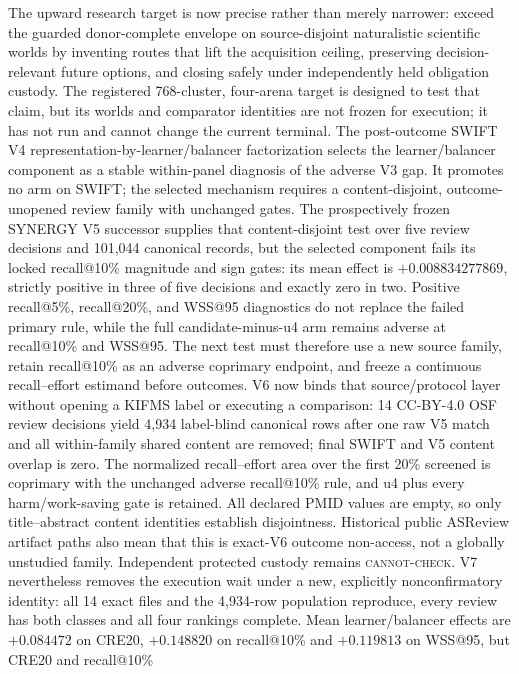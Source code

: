 \documentclass[11pt]{article}
\theoremstyle{definition}
\begin{document}
The upward research target is now precise rather than merely narrower: exceed
the guarded donor-complete envelope on source-disjoint naturalistic scientific
worlds by inventing routes that lift the acquisition ceiling, preserving
decision-relevant future options, and closing safely under independently held
obligation custody.  The registered 768-cluster, four-arena target is designed
to test that claim, but its worlds and comparator identities are not frozen for
execution; it has not run and cannot change the current terminal.  The
post-outcome SWIFT V4 representation-by-learner/balancer factorization selects
the learner/balancer component as a stable within-panel diagnosis of the
adverse V3 gap.  It promotes no arm on SWIFT; the selected mechanism requires a
content-disjoint, outcome-unopened review family with unchanged gates.  The
prospectively frozen SYNERGY V5 successor supplies that content-disjoint test
over five review decisions and 101,044 canonical records, but the selected
component fails its locked recall@10\% magnitude and sign gates: its mean
effect is $+0.008834277869$, strictly positive in three of five decisions and
exactly zero in two.  Positive recall@5\%, recall@20\%, and WSS@95 diagnostics
do not replace the failed primary rule, while the full candidate-minus-u4 arm
remains adverse at recall@10\% and WSS@95.  The next test must therefore use a
new source family, retain recall@10\% as an adverse coprimary endpoint, and
freeze a continuous recall--effort estimand before outcomes.  V6 now binds that
source/protocol layer without opening a KIFMS label or executing a comparison:
14 CC-BY-4.0 OSF review decisions yield 4,934 label-blind canonical rows after
one raw V5 match and all within-family shared content are removed; final SWIFT
and V5 content overlap is zero.  The normalized recall--effort area over the
first 20\% screened is coprimary with the unchanged adverse recall@10\% rule,
and u4 plus every harm/work-saving gate is retained.  All declared PMID values
are empty, so only title--abstract content identities establish disjointness.
Historical public ASReview artifact paths also mean that this is exact-V6
outcome non-access, not a globally unstudied family.  Independent protected
custody remains \textsc{cannot-check}. V7 nevertheless removes the execution
wait under a new, explicitly nonconfirmatory identity: all 14 exact files and
the 4,934-row population reproduce, every review has both classes and all four
rankings complete. Mean learner/balancer effects are $+0.084472$ on CRE20,
$+0.148820$ on recall@10\% and $+0.119813$ on WSS@95, but CRE20 and recall@10\%
\end{document}
